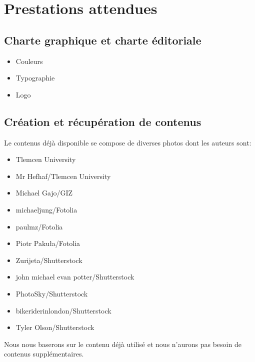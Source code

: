 \documentclass[oneside]{report}
\newcommand{\writecol}[1] {
	\subitem{\textcolor[HTML]{#1}{\# #1}}
}
\begin{document}
	\chapter{Prestations attendues}
	{
		\section{Charte graphique et charte éditoriale}
			\begin{itemize}
				\item{Couleurs}
					\writecol{639D35}
					\writecol{040707}
					\writecol{868786}
					\writecol{005899}
				\item{Typographie}
				\item{Logo}
			\end{itemize}
		\section{Création et récupération de contenus}
		{
			Le contenus déjà disponible se compose de diverses photos dont les auteurs sont:
			\begin{itemize}
				\item Tlemcen University
				\item Mr Hefhaf/Tlemcen University
				\item Michael Gajo/GIZ
				\item michaeljung/Fotolia
				\item paulmz/Fotolia
				\item Piotr Pakuła/Fotolia
				\item Zurijeta/Shutterstock
				\item john michael evan potter/Shutterstock
				\item PhotoSky/Shutterstock
				\item bikeriderinlondon/Shutterstock
				\item Tyler Olson/Shutterstock
			\end{itemize}
			Nous nous baserons sur le contenu déjà utilisé et nous n'aurons pas besoin de contenus supplémentaires.
		}
}
\end{document}
